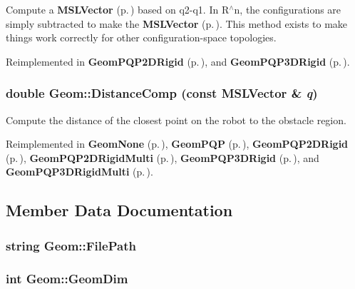 Compute a {\bf MSLVector} {\rm (p.\,\pageref{classMSLVector})} based on q2-q1. In R$^\wedge$n, the configurations are simply subtracted to make the {\bf MSLVector} {\rm (p.\,\pageref{classMSLVector})}. This method exists to make things work correctly for other configuration-space topologies.



Reimplemented in {\bf Geom\-PQP2DRigid} {\rm (p.\,\pageref{classGeomPQP2DRigid_a4})}, and {\bf Geom\-PQP3DRigid} {\rm (p.\,\pageref{classGeomPQP3DRigid_a4})}.
\subsubsection{\setlength{\rightskip}{0pt plus 5cm}double Geom::Distance\-Comp (const {\bf MSLVector} \& {\em q})\hspace{0.3cm}{\tt  [pure virtual]}}\label{classGeom_a3}


Compute the distance of the closest point on the robot to the obstacle region.



Reimplemented in {\bf Geom\-None} {\rm (p.\,\pageref{classGeomNone_a3})}, {\bf Geom\-PQP} {\rm (p.\,\pageref{classGeomPQP_a5})}, {\bf Geom\-PQP2DRigid} {\rm (p.\,\pageref{classGeomPQP2DRigid_a3})}, {\bf Geom\-PQP2DRigid\-Multi} {\rm (p.\,\pageref{classGeomPQP2DRigidMulti_a3})}, {\bf Geom\-PQP3DRigid} {\rm (p.\,\pageref{classGeomPQP3DRigid_a3})}, and {\bf Geom\-PQP3DRigid\-Multi} {\rm (p.\,\pageref{classGeomPQP3DRigidMulti_a3})}.

\subsection{Member Data Documentation}
\subsubsection{\setlength{\rightskip}{0pt plus 5cm}string Geom::File\-Path\hspace{0.3cm}{\tt  [protected]}}\label{classGeom_n0}


\subsubsection{\setlength{\rightskip}{0pt plus 5cm}int Geom::Geom\-Dim}\label{classGeom_m1}



